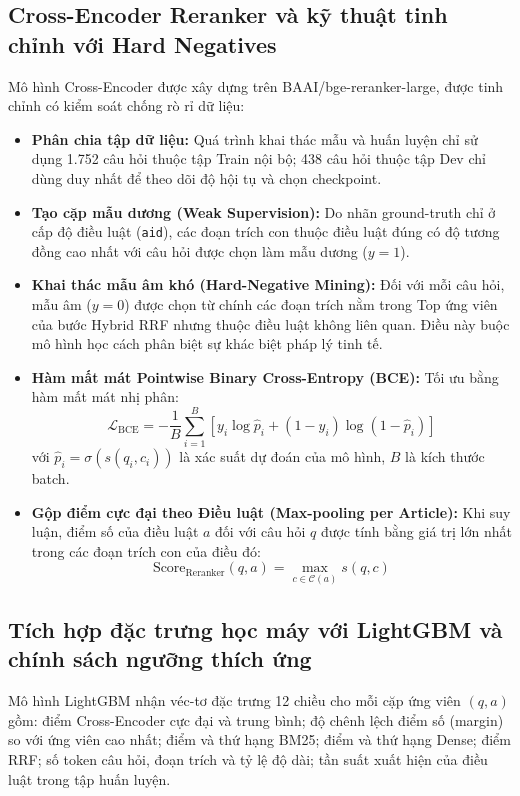 \documentclass[12pt,a4paper]{article}
\begin{document}
\subsection{Cross-Encoder Reranker và kỹ thuật tinh chỉnh với Hard Negatives}
Mô hình Cross-Encoder được xây dựng trên BAAI/bge-reranker-large, được tinh chỉnh có kiểm soát chống rò rỉ dữ liệu:
\begin{itemize}[leftmargin=0.7cm]
    \item \textbf{Phân chia tập dữ liệu:} Quá trình khai thác mẫu và huấn luyện chỉ sử dụng 1.752 câu hỏi thuộc tập Train nội bộ; 438 câu hỏi thuộc tập Dev chỉ dùng duy nhất để theo dõi độ hội tụ và chọn checkpoint.
    \item \textbf{Tạo cặp mẫu dương (Weak Supervision):} Do nhãn ground-truth chỉ ở cấp độ điều luật (\texttt{aid}), các đoạn trích con thuộc điều luật đúng có độ tương đồng cao nhất với câu hỏi được chọn làm mẫu dương ($y = 1$).
    \item \textbf{Khai thác mẫu âm khó (Hard-Negative Mining):} Đối với mỗi câu hỏi, mẫu âm ($y = 0$) được chọn từ chính các đoạn trích nằm trong Top ứng viên của bước Hybrid RRF nhưng thuộc điều luật không liên quan. Điều này buộc mô hình học cách phân biệt sự khác biệt pháp lý tinh tế.
    \item \textbf{Hàm mất mát Pointwise Binary Cross-Entropy (BCE):} Tối ưu bằng hàm mất mát nhị phân:
    \begin{equation}
    \mathcal{L}_{\text{BCE}} = -\frac{1}{B} \sum_{i=1}^{B} \left[ y_i \log \hat{p}_i + (1 - y_i) \log (1 - \hat{p}_i) \right]
    \label{eq:bce_loss}
    \end{equation}
    với $\hat{p}_i = \sigma(s(q_i, c_i))$ là xác suất dự đoán của mô hình, $B$ là kích thước batch.
    \item \textbf{Gộp điểm cực đại theo Điều luật (Max-pooling per Article):} Khi suy luận, điểm số của điều luật $a$ đối với câu hỏi $q$ được tính bằng giá trị lớn nhất trong các đoạn trích con của điều đó:
    \begin{equation}
    \text{Score}_{\text{Reranker}}(q, a) = \max_{c \in \mathcal{C}(a)} s(q, c)
    \label{eq:max_pool}
    \end{equation}
\end{itemize}

\subsection{Tích hợp đặc trưng học máy với LightGBM và chính sách ngưỡng thích ứng}
Mô hình LightGBM nhận véc-tơ đặc trưng 12 chiều cho mỗi cặp ứng viên $(q, a)$ gồm: điểm Cross-Encoder cực đại và trung bình; độ chênh lệch điểm số (margin) so với ứng viên cao nhất; điểm và thứ hạng BM25; điểm và thứ hạng Dense; điểm RRF; số token câu hỏi, đoạn trích và tỷ lệ độ dài; tần suất xuất hiện của điều luật trong tập huấn luyện.
\end{document}
